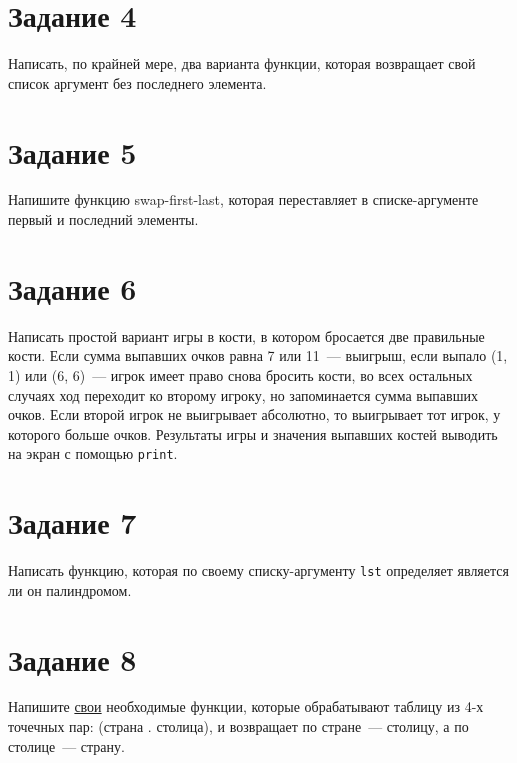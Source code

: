 
\section{Задание 4}

Написать, по крайней мере, два варианта функции, которая возвращает свой список аргумент без последнего элемента.


\section{Задание 5}

Напишите функцию swap-first-last, которая переставляет в списке-аргументе первый и последний элементы.


\section{Задание 6}

Написать простой вариант игры в кости, в котором бросается две правильные кости.
Если сумма выпавших очков равна 7 или 11~--- выигрыш, если выпало (1, 1) или (6, 6)~--- игрок имеет право снова бросить кости, во всех остальных случаях ход переходит ко второму игроку, но запоминается сумма выпавших очков. 
Если второй игрок не выигрывает абсолютно, то выигрывает тот игрок, у которого больше очков. 
Результаты игры и значения выпавших костей выводить на экран с помощью \texttt{print}.


\section{Задание 7}

Написать функцию, которая по своему списку-аргументу \texttt{lst} определяет является ли он палиндромом.


\section{Задание 8}

Напишите \underline{свои} необходимые функции, которые обрабатывают таблицу из 4-х точечных пар: (страна . столица), и возвращает по стране~--- столицу, а по столице~--- страну.

